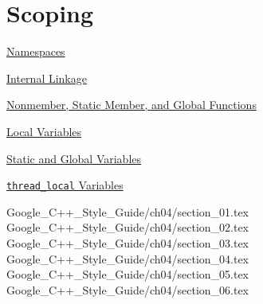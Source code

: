 
\chapter{Scoping}\label{ch:scoping}

\begin{introduction}
    \item \hyperref[sec:namespaces]{Namespaces}
    \item \hyperref[sec:internal-linkage]{Internal Linkage}
    \item \hyperref[sec:nonmember-static-member-and-global-functions]{Nonmember, Static Member, and Global Functions}
    \item \hyperref[sec:local-variables]{Local Variables}
    \item \hyperref[sec:static-and-global-variables]{Static and Global Variables}
    \item \hyperref[sec:thread_local-variables]{\texttt{thread_local} Variables}
\end{introduction}

{Google_C++_Style_Guide/ch04/section_01.tex}
{Google_C++_Style_Guide/ch04/section_02.tex}
{Google_C++_Style_Guide/ch04/section_03.tex}
{Google_C++_Style_Guide/ch04/section_04.tex}
{Google_C++_Style_Guide/ch04/section_05.tex}
{Google_C++_Style_Guide/ch04/section_06.tex}







